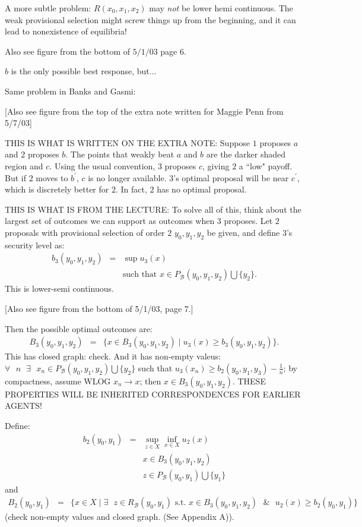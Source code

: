 \documentclass[12pt]{article}
\newcommand{\n}{\noindent}
\newcommand{\s}{\vspace{5mm}}
\begin{document}
\s
\n A more subtle problem: $R(x_0,x_1,x_2)$ may \textit{not} be lower hemi continuous.  The weak provisional selection might screw things up from the beginning, and it can lead to nonexistence of equilibria!  

\begin{center}  Also see figure from the bottom of $5/1/03$ page $6$.
\end{center}  $b$ is the only possible best response, but...
 
\s
\n  Same problem in Banks and Gasmi:
\begin{center}
[Also see figure from the top of the extra note written for Maggie Penn from 5/7/03]
\end{center}
\n  THIS IS WHAT IS WRITTEN ON THE EXTRA NOTE:  Suppose $1$ proposes $a$ and $2$ proposes $b$.  The points that weakly beat $a$ and $b$ are the darker shaded region and $c$.  Using the usual convention, $3$ proposes $c$, giving $2$ a ``low" payoff.  But if $2$ moves to $b^{\prime}$, $c$ is no longer available.  $3$'s optimal proposal will be near $c^{\prime}$, which is discretely better for $2$.  In fact, $2$ has no optimal proposal.

\s
\n  THIS IS WHAT IS FROM THE LECTURE:  To solve all of this, think about the largest set of outcomes we can support as outcomes when $3$ proposes.  Let $2$ proposals with provisional selection of order $2$ $y_0,y_1,y_2$ be given, and define $3$'s security level as:
\begin{eqnarray*}
b_3(y_0,y_1,y_2)&=&\sup u_3(x)\\
&&\mbox{such that }x\in P_\mathcal{B}(y_0,y_1,y_2)\bigcup\{y_2\}.
\end{eqnarray*}  This is lower-semi continuous.
\begin{center}
[Also see figure from the bottom of 5/1/03, page 7.]
\end{center}  Then the possible optimal outcomes are:
\begin{eqnarray*}
B_3(y_0,y_1,y_2)&=&\{x\in B_3(y_0,y_1,y_2)\mid u_3(x)\geq b_3(y_0,y_1,y_2)\}.
\end{eqnarray*}  This has closed graph: check.  And it has non-empty valeus: $\forall\mbox{ }n\mbox{ }\exists\mbox{ } x_n\in P_{\mathcal{B}}(y_0,y_1,y_2)\bigcup\{y_2\}$ such that $u_3(x_n)\geq b_2(y_0,y_1,y_3)-\frac{1}{n}$;  by compactness, assume WLOG $x_n\longrightarrow x$; then $x\in B_3(y_0,y_1,y_2)$.  THESE PROPERTIES WILL BE INHERITED CORRESPONDENCES FOR EARLIER AGENTS!

\s
\n  Define:
\begin{eqnarray*}
b_2(y_0,y_1)&=&\sup_{z\in X}\inf_{x\in X} u_2(x)\\
&&x\in B_3(y_0,y_1,y_2)\\
&&z\in P_{\mathcal{B}}(y_0,y_1)\bigcup\{y_1\}
\end{eqnarray*} and
\begin{eqnarray*}
B_2(y_0,y_1)&=&\{x\in X\mid \exists\mbox{ }z\in R_{\mathcal{B}}(y_0,y_1)\mbox{ s.t. }x\in B_3(y_0,y_1,y_2)\mbox{ }\&\mbox{ }u_2(x)\geq b_2(y_0,y_1)\}
\end{eqnarray*}  (check non-empty values and closed graph.  (See Appendix A)).
\end{document}

